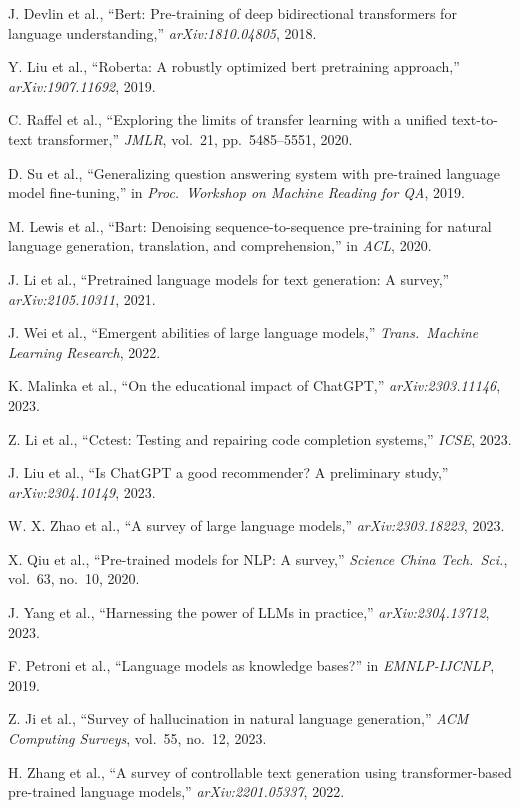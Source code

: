 \documentclass[11pt,UTF8,fontset=fandol]{ctexart}
\begin{document}
\begin{enumerate}[leftmargin=2em,label={[\arabic*]}]
\item J. Devlin et al., ``Bert: Pre-training of deep bidirectional transformers for language understanding,'' \textit{arXiv:1810.04805}, 2018.
\item Y. Liu et al., ``Roberta: A robustly optimized bert pretraining approach,'' \textit{arXiv:1907.11692}, 2019.
\item C. Raffel et al., ``Exploring the limits of transfer learning with a unified text-to-text transformer,'' \textit{JMLR}, vol.~21, pp.~5485--5551, 2020.
\item D. Su et al., ``Generalizing question answering system with pre-trained language model fine-tuning,'' in \textit{Proc.\ Workshop on Machine Reading for QA}, 2019.
\item M. Lewis et al., ``Bart: Denoising sequence-to-sequence pre-training for natural language generation, translation, and comprehension,'' in \textit{ACL}, 2020.
\item J. Li et al., ``Pretrained language models for text generation: A survey,'' \textit{arXiv:2105.10311}, 2021.
\item J. Wei et al., ``Emergent abilities of large language models,'' \textit{Trans.\ Machine Learning Research}, 2022.
\item K. Malinka et al., ``On the educational impact of ChatGPT,'' \textit{arXiv:2303.11146}, 2023.
\item Z. Li et al., ``Cctest: Testing and repairing code completion systems,'' \textit{ICSE}, 2023.
\item J. Liu et al., ``Is ChatGPT a good recommender? A preliminary study,'' \textit{arXiv:2304.10149}, 2023.
\item W. X. Zhao et al., ``A survey of large language models,'' \textit{arXiv:2303.18223}, 2023.
\item X. Qiu et al., ``Pre-trained models for NLP: A survey,'' \textit{Science China Tech.\ Sci.}, vol.~63, no.~10, 2020.
\item J. Yang et al., ``Harnessing the power of LLMs in practice,'' \textit{arXiv:2304.13712}, 2023.
\item F. Petroni et al., ``Language models as knowledge bases?'' in \textit{EMNLP-IJCNLP}, 2019.
\item Z. Ji et al., ``Survey of hallucination in natural language generation,'' \textit{ACM Computing Surveys}, vol.~55, no.~12, 2023.
\item H. Zhang et al., ``A survey of controllable text generation using transformer-based pre-trained language models,'' \textit{arXiv:2201.05337}, 2022.

\end{enumerate}
\end{document}
